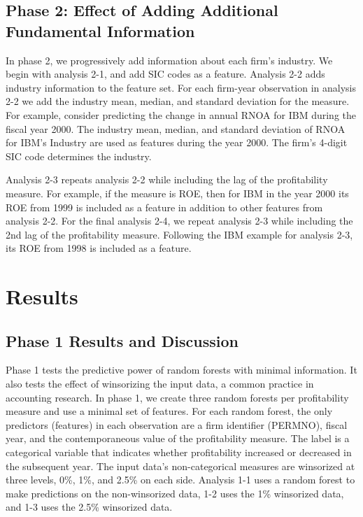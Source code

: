 \subsection{Phase 2: Effect of Adding Additional Fundamental Information}
In phase 2, we progressively add information about each firm's industry.  We begin with analysis 2-1, and add SIC codes as a feature.  Analysis 2-2 adds industry information to the feature set.  For each firm-year observation in analysis 2-2 we add the industry mean, median, and standard deviation for the measure. For example, consider predicting the change in annual RNOA for IBM during the fiscal year 2000.  The industry mean, median, and standard deviation of RNOA for IBM's Industry are used as features during the year 2000.  The firm's 4-digit SIC code determines the industry.

Analysis 2-3 repeats analysis 2-2 while including the lag of the profitability measure.  For example, if the measure is ROE, then for IBM in the year 2000 its ROE from 1999 is included as a feature in addition to other features from analysis 2-2.  For the final analysis 2-4,  we repeat analysis 2-3 while including the 2nd lag of the profitability measure.  Following the IBM example for analysis 2-3, its ROE from 1998 is included as a feature.

\section{Results}

\subsection{Phase 1 Results and Discussion}
Phase 1 tests the predictive power of random forests with minimal information. It also tests the effect of winsorizing the input data, a common practice in accounting research.  In phase 1, we create three random forests per profitability measure and use a minimal set of features. For each random forest, the only predictors (features) in each observation are a firm identifier (PERMNO),  fiscal year, and the contemporaneous value of the profitability measure. The label is a categorical variable that indicates whether profitability increased or decreased in the subsequent year. The input data's non-categorical measures are winsorized at three levels, 0\%, 1\%, and 2.5\% on each side. Analysis 1-1 uses a random forest to make predictions on the non-winsorized data, 1-2 uses the 1\% winsorized data, and 1-3 uses the 2.5\% winsorized data.

